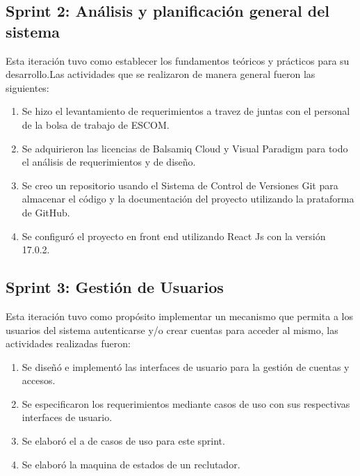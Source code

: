 \subsection{Sprint 2: Análisis y planificación general del sistema}
Esta iteración tuvo como establecer los fundamentos teóricos y prácticos para su desarrollo.Las actividades que se realizaron 
de manera general fueron las siguientes:
\begin{enumerate}
    \item Se hizo el levantamiento de requerimientos a travez de juntas con el personal de la bolsa de trabajo de ESCOM.
    \item Se adquirieron las licencias de Balsamiq Cloud y Visual Paradigm  para todo el análisis de
    requerimientos y de diseño.
    \item Se creo un repositorio usando el Sistema de Control de Versiones Git para almacenar el código y la documentación del proyecto
    utilizando la prataforma de GitHub.
    \item Se configuró el proyecto en front end utilizando React Js con la versión 17.0.2.
\end{enumerate} 


\subsection{Sprint 3: Gestión de Usuarios}
Esta iteración tuvo como propósito implementar un mecanismo que permita a los usuarios del sistema autenticarse y/o crear cuentas
para acceder al mismo, las actividades realizadas fueron:
\begin{enumerate}
    \item Se diseñó e implementó las interfaces de usuario para la gestión de cuentas y accesos.
    \item Se especificaron los requerimientos mediante casos de uso con sus respectivas interfaces de usuario.
    \item Se elaboró el a de casos de uso para este sprint.
    \item Se elaboró la maquina de estados de un reclutador.
\end{enumerate} 

